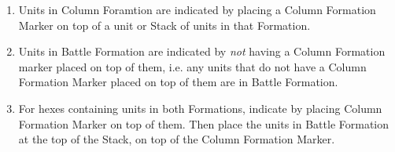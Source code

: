 \begin{enumerate}
  \item Units in Column Foramtion are indicated by placing a Column Formation Marker on top of a unit or Stack of units in that Formation.

  \item Units in Battle Formation are indicated by \textit{not} having a Column Formation marker placed on top of them, i.e. any units that do not have a Column Formation Marker placed on top of them are in Battle Formation.

  \item For hexes containing units in both Formations, indicate by placing Column Formation Marker on top of them. Then place the units in Battle Formation at the top of the Stack, on top of the Column Formation Marker.
\end{enumerate}